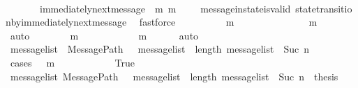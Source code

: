 \begin{isabellebody}
\ \ \ \ \ \ \ \ \isamarkupfalse%
\ {\isacartoucheopen}{\isasymsigma}\ {\isasymin}\ {\isasymSigma}{\isacartoucheclose}\ {\isacartoucheopen}{\isasymsigma}{\isacharprime}\ {\isasymin}\ {\isasymSigma}{\isacartoucheclose}\ {\isacartoucheopen}immediately{\isacharunderscore}next{\isacharunderscore}message\ {\isacharparenleft}{\isasymsigma}{\isacharcomma}\ m{\isacharparenright}{\isacartoucheclose}\ {\isacartoucheopen}m\ {\isasymin}\ {\isasymsigma}{\isacharprime}\ {\isacharminus}\ {\isasymsigma}{\isacartoucheclose}\ message{\isacharunderscore}in{\isacharunderscore}state{\isacharunderscore}is{\isacharunderscore}valid\ state{\isacharunderscore}transition{\isacharunderscore}by{\isacharunderscore}immediately{\isacharunderscore}next{\isacharunderscore}message\ \isamarkupfalse%
\ fastforce\isanewline
\ \ \ \ \ \ \isamarkupfalse%
\ {\isachardoublequoteopen}{\isasymsigma}\ {\isasymunion}\ {\isacharbraceleft}m{\isacharbraceright}\ {\isasymsubseteq}\ {\isasymsigma}{\isacharprime}{\isachardoublequoteclose}\isanewline
\ \ \ \ \ \ \ \ \isamarkupfalse%
\ {\isacartoucheopen}{\isasymsigma}\ {\isasymsubseteq}\ {\isasymsigma}{\isacharprime}{\isacartoucheclose}\ {\isacartoucheopen}m\ {\isasymin}\ {\isasymsigma}{\isacharprime}\ {\isacharminus}\ {\isasymsigma}{\isacartoucheclose}\ \isamarkupfalse%
\ auto\isanewline
\ \ \ \ \ \ \isamarkupfalse%
\ {\isachardoublequoteopen}m\ {\isasymnotin}\ {\isasymsigma}{\isachardoublequoteclose}\isanewline
\ \ \ \ \ \ \ \ \isamarkupfalse%
\ {\isacartoucheopen}m\ {\isasymin}\ {\isasymsigma}{\isacharprime}\ {\isacharminus}\ {\isasymsigma}{\isacartoucheclose}\ \isamarkupfalse%
\ auto\isanewline
\isanewline
\ \ \ \ \ \ \isamarkupfalse%
\ message{\isacharunderscore}list\ \ {\isachardoublequoteopen}MessagePath\ {\isasymsigma}\ {\isasymsigma}{\isacharprime}\ message{\isacharunderscore}list\ {\isasymand}\ length\ message{\isacharunderscore}list\ {\isacharequal}\ Suc\ n{\isachardoublequoteclose}\isanewline
\ \ \ \ \ \ \isamarkupfalse%
\ {\isacharparenleft}cases\ {\isachardoublequoteopen}{\isasymsigma}\ {\isasymunion}\ {\isacharbraceleft}m{\isacharbraceright}\ {\isacharequal}\ {\isasymsigma}{\isacharprime}{\isachardoublequoteclose}{\isacharparenright}\isanewline
\ \ \ \ \ \ \ \ \isamarkupfalse%
\ True\isanewline
\ \ \ \ \ \ \ \ \isamarkupfalse%
\ {\isachardoublequoteopen}{\isasymAnd}message{\isacharunderscore}list{\isachardot}\ MessagePath\ {\isasymsigma}\ {\isasymsigma}{\isacharprime}\ message{\isacharunderscore}list\ {\isasymand}\ length\ message{\isacharunderscore}list\ {\isacharequal}\ Suc\ n\ {\isasymLongrightarrow}\ thesis{\isachardoublequoteclose}\isanewline

\end{isabellebody}
